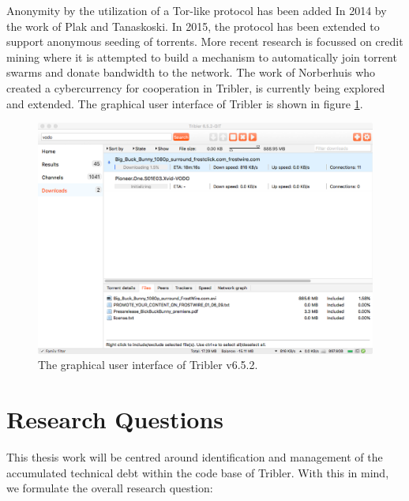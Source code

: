 Anonymity by the utilization of a Tor-like protocol has been added In 2014 by the work of  Plak\cite{plak2014anonymous} and Tanaskoski\cite{tanaskoski2014anonymous}. 
In 2015, the protocol has been extended to support anonymous seeding of torrents\cite{ruigrok2015bittorrent}.
More recent research is focussed on credit mining where it is attempted to build a mechanism to automatically join torrent swarms and donate bandwidth to the network. The work of Norberhuis\cite{norberhuis2015multichain} who created a cybercurrency for cooperation in Tribler, is currently being explored and extended.
The graphical user interface of Tribler is shown in figure \ref{fig:tribler-interface}.\\

\begin{figure}[h!]
	\centering
	\includegraphics[width=1.0\columnwidth]{images/introduction/tribler_interface}
	\caption{The graphical user interface of Tribler v6.5.2.}
	\label{fig:tribler-interface}
\end{figure}

\section{Research Questions}
This thesis work will be centred around identification and management of the accumulated technical debt within the code base of Tribler. With this in mind, we formulate the overall research question:\\

\noindent{}\\

